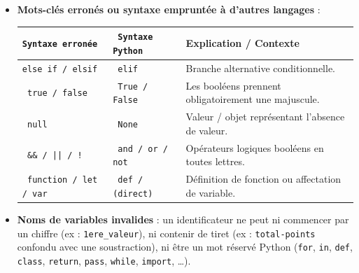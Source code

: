 \documentclass[11pt,a4paper]{article}
\begin{document}
\begin{tcolorbox}[left=0cm,title=\bf{\faBug \; 1. Erreurs de syntaxe (SyntaxError)},colbacktitle=cfond]
\begin{itemize}
	\item[\textbullet] \textbf{Mots-clés erronés ou syntaxe empruntée à d'autres langages} :
	\begin{tabularx}{\linewidth}{|>{\tt}l|>{\tt}l|X|}
		\hline
		\textbf{Syntaxe erronée} & \textbf{Syntaxe Python} & \textbf{Explication / Contexte} \\
		\hline
		else if / elsif & elif & Branche alternative conditionnelle. \\
		\hline
		true / false & True / False & Les booléens prennent obligatoirement une majuscule. \\
		\hline
		null & None & Valeur / objet représentant l'absence de valeur. \\
		\hline
		\&\& / || / ! & and / or / not & Opérateurs logiques booléens en toutes lettres. \\
		\hline
		function / let / var & def / (direct) & Définition de fonction ou affectation de variable. \\
		\hline
	\end{tabularx}

	\item[\textbullet] \textbf{Noms de variables invalides} : un identificateur ne peut ni commencer par un chiffre (ex : {\tt 1ere\_valeur}), ni contenir de tiret (ex : {\tt total-points} confondu avec une soustraction), ni être un mot réservé Python ({\tt for}, {\tt in}, {\tt def}, {\tt class}, {\tt return}, {\tt pass}, {\tt while}, {\tt import}, \dots).
\end{itemize}
\end{tcolorbox}
\end{document}
